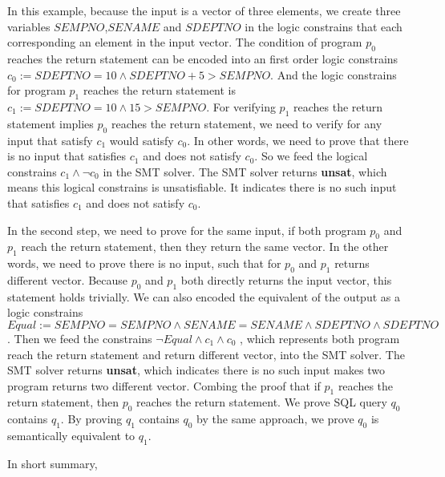 %
In this example, because the input is a vector of three elements, we create three variables $SEMPNO$,$SENAME$ and $SDEPTNO$ in the logic constrains that each 
corresponding an element in the input vector.
%
The condition of program $p_0$ reaches the return statement can be encoded into an first order logic constrains \\
$c_0 := SDEPTNO = 10 \land SDEPTNO + 5 > SEMPNO$.
%
And the logic constrains for program $p_1$ reaches the return statement is $c_1 := SDEPTNO = 10 \land 15 > SEMPNO$.
%
For verifying $p_1$ reaches the return statement implies $p_0$ reaches the return statement, 
we need to verify for any input that satisfy $c_1$ would satisfy $c_0$.
%
In other words, we need to prove that there is no input that satisfies $c_1$ and does not satisfy $c_0$.
%
So we feed the logical constrains $c_1 \land \neg c_0$ in the SMT solver. 
%
The SMT solver returns \textbf{unsat}, which means this logical constrains is unsatisfiable.
%
It indicates there is no such input that satisfies $c_1$ and does not satisfy $c_0$.

%
In the second step, we need to prove for the same input, if both program $p_0$ and $p_1$ reach the return statement, then they return the same vector.
%
In the other words, we need to prove there is no input, such that for $p_0$ and $p_1$ returns different vector.
%
Because $p_0$ and $p_1$ both directly returns the input vector, this statement holds trivially.
%
We can also encoded the equivalent of the output as a logic constrains $Equal := SEMPNO = SEMPNO \land SENAME = SENAME \land  SDEPTNO \land SDEPTNO$.
%
Then we feed the constrains $\neg Equal \land c_1 \land c_0$ , which represents both program reach the return statement and return different vector, 
into the SMT solver.
%
The SMT solver returns \textbf{unsat}, which indicates there is no such input makes two program returns two different vector.
%
Combing the proof that if $p_1$ reaches the return statement, then $p_0$ reaches the return statement.
%
We prove SQL query $q_0$ contains $q_1$.
%
By proving $q_1$ contains $q_0$ by the same approach, we prove $q_0$ is semantically equivalent to $q_1$.

In short summary, 


